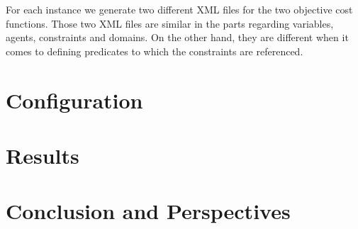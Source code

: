 \documentclass{article}
\begin{document}
	For each instance we generate two different XML files for the two objective cost functions. Those two XML files are similar in the parts regarding variables, agents, constraints and domains. On the other hand, they are different when it comes to defining predicates to which the constraints are referenced.
	
	\section{Configuration}
	\section{Results}
	\section{Conclusion and Perspectives}
	\newpage
	
	
\end{document}
